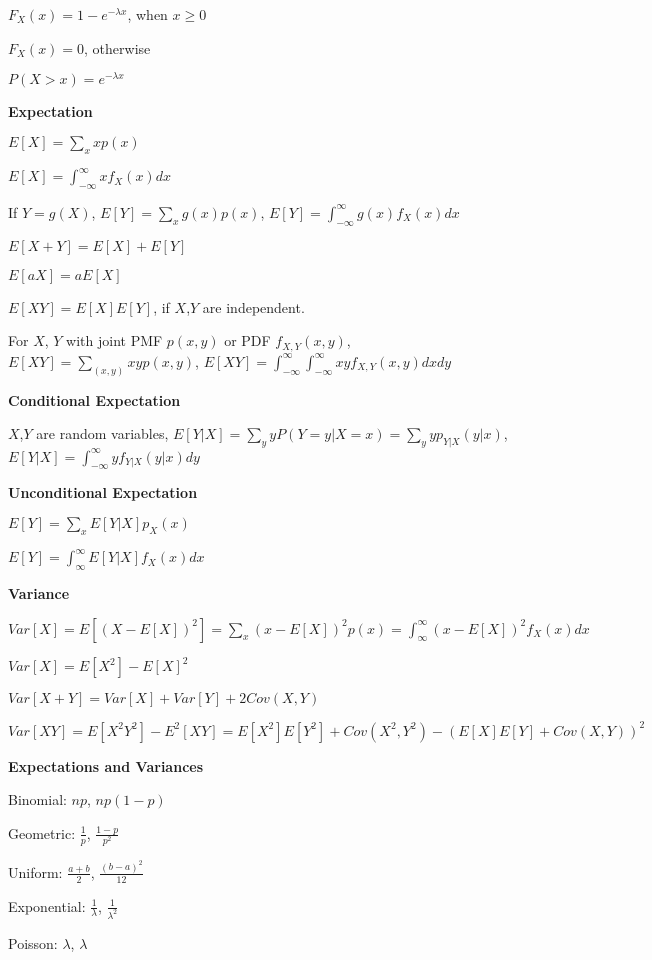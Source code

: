 \documentclass{scrartcl}
\begin{document}
\begin{multicols*}{3}
$F_X(x)= 1-e^{-\lambda x}$, when $x\geq 0$

$F_X(x)=0$, otherwise

$P(X>x)=e^{-\lambda x}$



{\bf Expectation}

$E[X] = \sum_xxp(x)$

$E[X] = \int_{-\infty}^{\infty}xf_X(x)dx$

If $Y=g(X)$, $E[Y] = \sum_xg(x)p(x)$, $E[Y] = \int_{-\infty}^{\infty}g(x)f_X(x)dx$

$E[X+Y] = E[X] + E[Y]$

$E[aX] = aE[X]$

$E[XY] = E[X]E[Y]$, if $X$,$Y$ are independent.

For $X$, $Y$ with joint PMF $p(x,y)$ or PDF $f_{X,Y}(x,y)$, $E[XY] = \sum_{(x,y)}xyp(x,y)$, $E[XY] = \int_{-\infty}^{\infty}\int_{-\infty}^{\infty}xyf_{X,Y}(x,y)dxdy$



{\bf Conditional Expectation}

$X$,$Y$ are random variables, $E[Y|X] = \sum_yyP(Y=y|X=x)=\sum_yyp_{Y|X}(y|x)$, $E[Y|X] = \int_{-\infty}^{\infty}yf_{Y|X}(y|x)dy$



{\bf Unconditional Expectation}

$E[Y] = \sum_xE[Y|X]p_X(x)$

$E[Y] = \int_{\infty}^{\infty}E[Y|X]f_X(x)dx$



{\bf Variance}

$Var[X] = E[(X-E[X])^2] = \sum_x(x-E[X])^2p(x) = \int_{\infty}^{\infty}(x-E[X])^2f_X(x)dx$

$Var[X]=E[X^2]-E[X]^2$

$Var[X+Y]=Var[X]+Var[Y]+2Cov(X,Y)$

$Var[XY]=E[X^2Y^2]-E^2[XY] = E[X^2]E[Y^2]+Cov(X^2,Y^2)-(E[X]E[Y]+Cov(X,Y))^2$



{\bf Expectations and Variances}

Binomial: $np$, $np(1-p)$

Geometric: $\frac{1}{p}$, $\frac{1-p}{p^2}$

Uniform: $\frac{a+b}{2}$, $\frac{(b-a)^2}{12}$

Exponential: $\frac{1}{\lambda}$, $\frac{1}{\lambda^2}$

Poisson: $\lambda$, $\lambda$




\end{multicols*}
\end{document}

